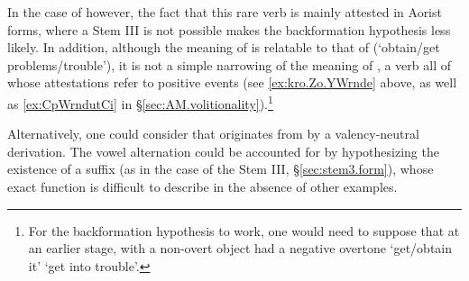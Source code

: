 In the case of  however, the fact that this rare verb is mainly attested in Aorist forms, where a Stem III is not possible makes the backformation hypothesis less likely. In addition, although the meaning of  is relatable to that of  (`obtain/get problems/trouble'), it is not a simple narrowing of the meaning of , a verb all of whose attestations refer to positive events (see \ref{ex:kro.Zo.YWrnde} above, as well as \ref{ex:CpWrndutCi} in §\ref{sec:AM.volitionality}).\footnote{For the backformation hypothesis to work, one would need to suppose that at an earlier stage,  with a non-overt object had a negative overtone `get/obtain it' \fl{} `get into trouble'. }

Alternatively, one could consider that  originates from  by a valency-neutral derivation. The vowel alternation could be accounted for by hypothesizing the existence of a  suffix (as in the case of the Stem III, §\ref{sec:stem3.form}), whose exact function is difficult to describe in the absence of other examples.

 
 
